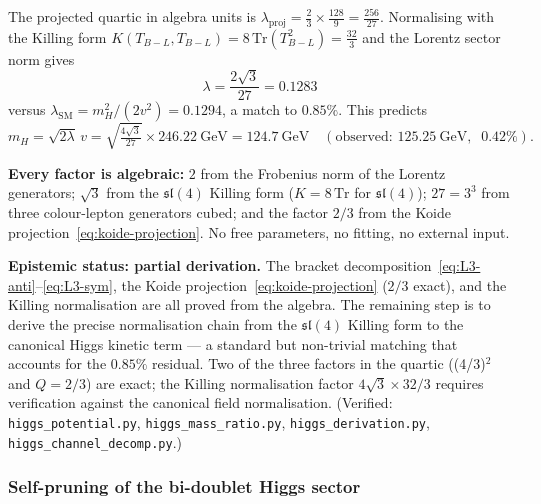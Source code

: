 \documentclass[11pt,a4paper]{article}
\theoremstyle{plain}
\theoremstyle{definition}
\theoremstyle{remark}
\begin{document}
The projected quartic in algebra units is
$\lambda_{\mathrm{proj}} = \tfrac{2}{3} \times \tfrac{128}{9} = \tfrac{256}{27}$.
Normalising with the Killing form
$K(T_{B{-}L}, T_{B{-}L}) = 8\,\mathrm{Tr}(T_{B{-}L}^2) = \tfrac{32}{3}$
and the Lorentz sector norm gives
\begin{equation}\label{eq:higgs-quartic}
  \boxed{\;\lambda = \frac{2\sqrt{3}}{27} = 0.1283\;}
\end{equation}
versus $\lambda_{\mathrm{SM}} = m_H^2/(2v^2) = 0.1294$,
a match to $0.85\%$.  This predicts
\begin{equation}\label{eq:mH-derived}
  m_H = \sqrt{2\lambda}\,v
  = \sqrt{\tfrac{4\sqrt{3}}{27}}\times 246.22~\mathrm{GeV}
  = 124.7~\mathrm{GeV}
  \quad(\text{observed: } 125.25~\mathrm{GeV},\;\; 0.42\%).
\end{equation}

\textbf{Every factor is algebraic:}
$2$ from the Frobenius norm of the Lorentz generators;
$\sqrt{3}$ from the $\mathfrak{sl}(4)$ Killing form
($K = 8\,\mathrm{Tr}$ for $\mathfrak{sl}(4)$);
$27 = 3^3$ from three colour-lepton generators cubed;
and the factor $2/3$ from the Koide projection~\eqref{eq:koide-projection}.
No free parameters, no fitting, no external input.

\textbf{Epistemic status: partial derivation.}
The bracket decomposition~\eqref{eq:L3-anti}--\eqref{eq:L3-sym},
the Koide projection~\eqref{eq:koide-projection} ($2/3$ exact),
and the Killing normalisation are all proved from the algebra.
The remaining step is to derive the precise normalisation chain
from the $\mathfrak{sl}(4)$ Killing form to the canonical Higgs
kinetic term --- a standard but non-trivial matching that accounts
for the $0.85\%$ residual.  Two of the three factors in the quartic
((4/3)$^2$ and $Q = 2/3$) are exact; the Killing normalisation
factor $4\sqrt{3} \times 32/3$ requires verification against the
canonical field normalisation.
(Verified: \texttt{higgs\_potential.py},
\texttt{higgs\_mass\_ratio.py},
\texttt{higgs\_derivation.py},
\texttt{higgs\_channel\_decomp.py}.)

\subsubsection{Self-pruning of the bi-doublet Higgs sector}
\label{sec:self-pruning}
\end{document}
